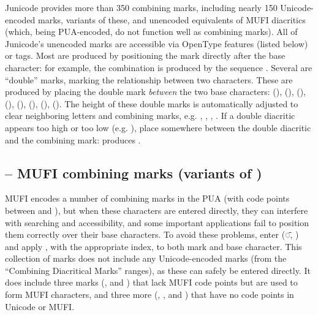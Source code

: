 Junicode provides more than 350 combining marks, including nearly 150 Unicode-encoded marks, variants of these,
and unencoded equivalents of MUFI diacritics (which, being PUA-encoded, do not function well as combining marks).
All of Junicode’s unencoded marks are accessible via OpenType features (listed below) or tags. Most are
produced by positioning the mark directly after the base character: for example, the combination
 is produced by the sequence . Several are “double” marks, marking
the relationship between two characters. These are produced by placing the double mark \textit{between}
the two base characters:  (),  (),
 (),  (),  (),
 (),  (),  (). The height of 
these double marks is automatically adjusted to clear neighboring letters and combining marks, e.g.
, , , . If a double
diacritic appears too high or too low (e.g. ), place 
 somewhere between the double diacritic and the combining mark:
 produces .

\subsection{ – MUFI combining marks (variants of )}\hypertarget{cv84}{}
MUFI encodes a number of combining marks in the PUA (with code points between  and ), but when these characters
are entered directly, they can interfere with searching and accessibility, and some important applications fail to
position them correctly over their base characters. To avoid these problems, enter  (◌̄, ) and apply , with the appropriate index, to both mark and base character. This
collection of marks does not include any Unicode-encoded marks (from the “Combining Diacritical Marks” ranges), as
these can safely be entered directly. It does include three marks (,
\textSourceText{[31]} and \textSourceText{[32]}) that lack MUFI code points but are used to form MUFI
characters, and three more (\textSourceText{[2]}, \textSourceText{[33]},
and \textSourceText{[34]}) that have no code points in Unicode or MUFI.


